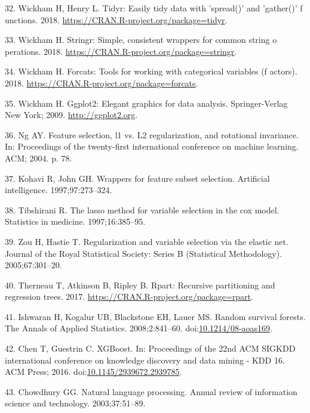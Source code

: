 \documentclass[12pt,oneside]{reedthesis}
\theoremstyle{definition}
\theoremstyle{definition}
\theoremstyle{definition}
\theoremstyle{remark}
\begin{document}
\leavevmode\hypertarget{ref-tidyr_2018}{}%
32. Wickham H, Henry L. Tidyr: Easily tidy data with 'spread()' and
'gather()' f unctions. 2018.
\url{https://CRAN.R-project.org/package=tidyr}.

\leavevmode\hypertarget{ref-stringr_2018}{}%
33. Wickham H. Stringr: Simple, consistent wrappers for common string o
perations. 2018. \url{https://CRAN.R-project.org/package=stringr}.

\leavevmode\hypertarget{ref-forcats_2018}{}%
34. Wickham H. Forcats: Tools for working with categorical variables (f
actors). 2018. \url{https://CRAN.R-project.org/package=forcats}.

\leavevmode\hypertarget{ref-gglot2_2009}{}%
35. Wickham H. Ggplot2: Elegant graphics for data analysis.
Springer-Verlag New York; 2009. \url{http://ggplot2.org}.

\leavevmode\hypertarget{ref-Ng_2004}{}%
36. Ng AY. Feature selection, l1 vs. L2 regularization, and rotational
invariance. In: Proceedings of the twenty-first international conference
on machine learning. ACM; 2004. p. 78.

\leavevmode\hypertarget{ref-Kohavi_1997}{}%
37. Kohavi R, John GH. Wrappers for feature subset selection. Artificial
intelligence. 1997;97:273--324.

\leavevmode\hypertarget{ref-Tibshirani_1997}{}%
38. Tibshirani R. The lasso method for variable selection in the cox
model. Statistics in medicine. 1997;16:385--95.

\leavevmode\hypertarget{ref-Zou_2005}{}%
39. Zou H, Hastie T. Regularization and variable selection via the
elastic net. Journal of the Royal Statistical Society: Series B
(Statistical Methodology). 2005;67:301--20.

\leavevmode\hypertarget{ref-rpart_2017}{}%
40. Therneau T, Atkinson B, Ripley B. Rpart: Recursive partitioning and
regression trees. 2017. \url{https://CRAN.R-project.org/package=rpart}.

\leavevmode\hypertarget{ref-Ishwaran_2008}{}%
41. Ishwaran H, Kogalur UB, Blackstone EH, Lauer MS. Random survival
forests. The Annals of Applied Statistics. 2008;2:841--60.
doi:\href{https://doi.org/10.1214/08-aoas169}{10.1214/08-aoas169}.

\leavevmode\hypertarget{ref-Chen_2016}{}%
42. Chen T, Guestrin C. XGBoost. In: Proceedings of the 22nd ACM SIGKDD
international conference on knowledge discovery and data mining - KDD
16. ACM Press; 2016.
doi:\href{https://doi.org/10.1145/2939672.2939785}{10.1145/2939672.2939785}.

\leavevmode\hypertarget{ref-Chowdhury_2003}{}%
43. Chowdhury GG. Natural language processing. Annual review of
information science and technology. 2003;37:51--89.


\end{document}
